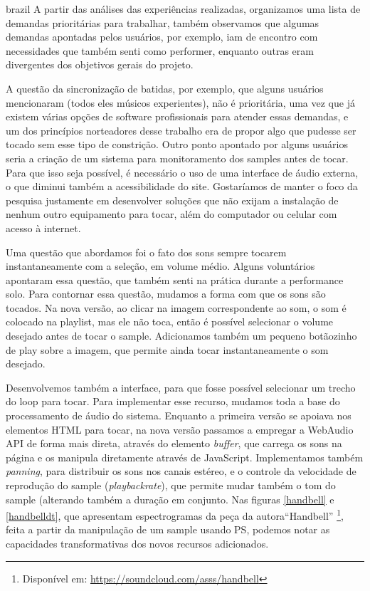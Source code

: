 \begin{otherlanguage*}{brazil}
 A partir das análises das experiências realizadas, organizamos uma lista de demandas prioritárias para trabalhar, também observamos que algumas demandas apontadas pelos usuários, por exemplo, iam de encontro com necessidades que também senti como performer, enquanto outras eram divergentes dos objetivos gerais do projeto.

 A questão da sincronização de batidas, por exemplo, que alguns usuários mencionaram (todos eles músicos experientes), não é prioritária, uma vez que já existem várias opções de software profissionais para atender essas demandas, e um dos princípios norteadores desse trabalho era de propor algo que pudesse ser tocado sem esse tipo de constrição. Outro ponto apontado por alguns usuários seria a criação de um sistema para monitoramento dos samples antes de tocar. Para que isso seja possível, é necessário o uso de uma interface de áudio externa, o que diminui também a acessibilidade do site. Gostaríamos de manter o foco da pesquisa justamente em desenvolver soluções que não exijam a instalação de nenhum outro equipamento para tocar, além do computador ou celular com acesso à internet. 

 Uma questão que abordamos foi o fato dos sons sempre tocarem instantaneamente com a seleção, em volume médio. Alguns voluntários apontaram essa questão, que também senti na prática durante a performance solo. Para contornar essa questão, mudamos a forma com que os sons são tocados. Na nova versão, ao clicar na imagem correspondente ao som, o som é colocado na playlist, mas ele não toca, então é possível selecionar o volume desejado antes de tocar o sample. Adicionamos também um pequeno botãozinho de play sobre a imagem, que permite ainda tocar instantaneamente o som desejado.

 Desenvolvemos também a interface, para que fosse possível selecionar um trecho do loop para tocar. Para implementar esse recurso, mudamos toda a base do processamento de áudio do sistema. Enquanto a primeira versão se apoiava nos elementos HTML para tocar, na nova versão passamos a empregar a WebAudio API de forma mais direta, através do elemento \emph{buffer}, que carrega os sons na página e os manipula diretamente através de JavaScript. Implementamos também \emph{panning}, para distribuir os sons nos canais estéreo, e o controle da velocidade de reprodução do sample (\emph{playbackrate}), que permite mudar também o tom do sample (alterando também a duração em conjunto. Nas figuras \ref{handbell} e \ref{handbelldt}, que apresentam espectrogramas da peça da autora``Handbell'' \footnote{Disponível em: \url{https://soundcloud.com/asss/handbell}}, feita a partir da manipulação de um sample usando PS, podemos notar as capacidades transformativas dos novos recursos adicionados. 




\end{otherlanguage*}
